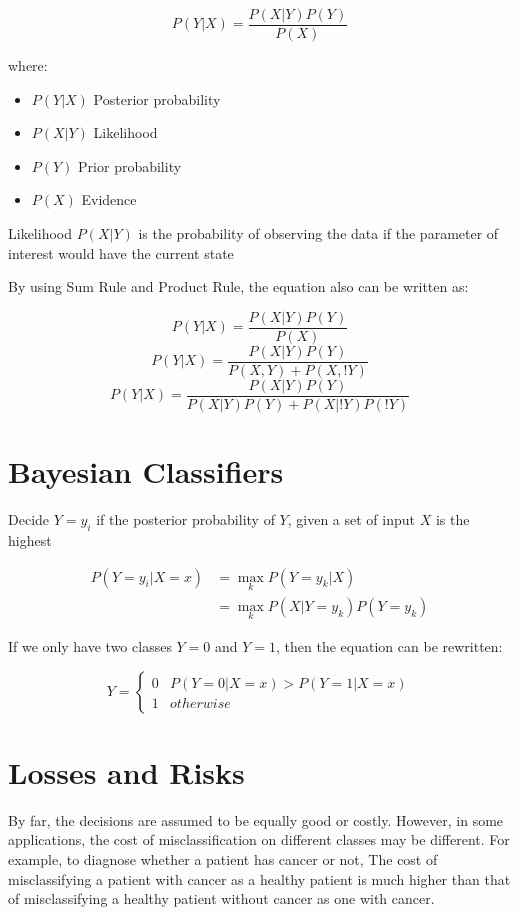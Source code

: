 \begin{multicols*}{2}
$$P(Y|X)= \frac{P(X|Y) P(Y)}{P(X)}$$

\noindent where:
\begin{itemize}
    \item $P(Y|X)$ Posterior probability
    \item $P(X|Y)$ Likelihood
    \item $P(Y)$ Prior probability
    \item $P(X)$ Evidence
\end{itemize}

\noindent Likelihood $P(X|Y)$ is the probability of observing the data if the parameter of interest would have the current state

\noindent By using Sum Rule and Product Rule, the equation also can be written as:

$$P(Y|X)= \frac{P(X|Y) P(Y)}{P(X)}$$
$$P(Y|X)= \frac{P(X|Y) P(Y)}{P(X,Y)+P(X,!Y)}$$
$$P(Y|X)= \frac{P(X|Y) P(Y)}{P(X|Y)P(Y)+P(X|!Y)P(!Y)}$$

\section{Bayesian Classifiers}

\noindent Decide $Y=y_{i}$ if the posterior probability of $Y$, given a set of input $X$ is the highest

\begin{equation*}
\begin{split}
    P(Y=y_{i}|X=x) &= \!\max_{k} P(Y=y_{k}|X) \\
    &= \!\max_{k} P(X | Y = y_k) P(Y= y_k)
\end{split}
\end{equation*}

\noindent If we only have two classes $Y=0$ and $Y=1$, then the equation can be rewritten:

$$
Y = 
\begin{cases}
0 & P(Y=0|X=x) > P(Y=1|X=x)\\
1 & otherwise
\end{cases}
$$

\section{Losses and Risks}

\noindent By far, the decisions are assumed to be equally good or costly. However, in some applications, the cost of misclassification on different classes may be different. For example, to diagnose whether a patient has cancer or not, The cost of misclassifying a patient with cancer as a healthy patient is much higher than that of misclassifying a healthy patient without cancer as one with cancer.


\end{multicols*}
